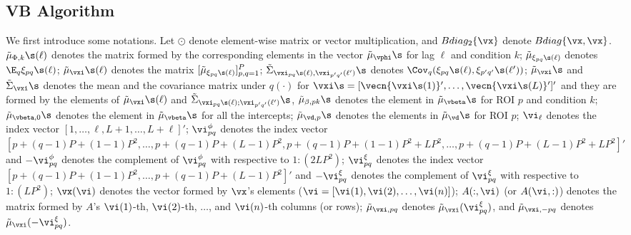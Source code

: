 {\color{blue}
\subsection*{VB Algorithm}
}
We first introduce some notations. Let $\odot$ denote element-wise matrix or vector multiplication, and $Bdiag_2\{\vx\}$ denote $Bdiag\{\vx, \vx\}$. 
$\tilde{\mu}_{\Phi,k}\s(\ell)$ denotes the matrix formed by the corresponding elements in the vector $\tilde{\mu}_{\vphi}\s$ for lag $\ell$ and condition $k$; 
$\tilde{\mu}_{\xi_{pq}\s(\ell)}$ denotes $\E_q\xi_{pq}\s(\ell)$; 
$\tilde{\mu}_{\vxi}\s(\ell)$ denotes the matrix $[\tilde{\mu}_{\xi_{pq}\s(\ell)}]_{p,q=1}^{P}$; 
$\tilde{\Sigma}_{\vxi_{pq}\s(\ell), \vxi_{p'q'}(\ell')}\s$ denotes $\Cov_q(\xi_{pq}\s(\ell), \xi_{p'q'}\s(\ell'))$; 
$\tilde{\mu}_{\vxi}\s$ and $\tilde{\Sigma}_{\vxi}\s$ denotes the mean and the covariance matrix under $q(\cdot)$ for $\vxi\s=[\vecn\{{\vxi}\s(1)\}', \dots, \vecn\{{\vxi}\s(L)\}']'$ and they are formed by the elements of $\tilde{\mu}_{\vxi}\s(\ell)$ and $\tilde{\Sigma}_{\vxi_{pq}\s(\ell); 
\vxi_{p'q'}(\ell')}\s$, $\tilde{\mu}_{\beta,pk}\s$ denotes the element in $\tilde{\mu}_{\vbeta}\s$ for ROI $p$ and condition $k$; 
$\tilde{\mu}_{\vbeta,0}\s$ denotes the element in $\tilde{\mu}_{\vbeta}\s$ for all the intercepts; 
$\tilde{\mu}_{\vd,p}\s$ denotes the elements in $\tilde{\mu}_{\vd}\s$ for ROI $p$; 
$\vi_{\ell}$ denotes the index vector $[1,\dots,\ell, L+1, \dots, L+\ell]'$; 
$\vi^{\phi}_{pq}$ denotes the index vector $[p+(q-1)P+(1-1)P^2, \dots, p+(q-1)P+(L-1)P^2, p+(q-1)P+(1-1)P^2+ LP^2, \dots, p+(q-1)P+(L-1)P^2 + LP^2]'$ and $-\vi^{\phi}_{pq}$ denotes the complement of $\vi^{\phi}_{pq}$ with respective to $1:(2LP^2)$; 
$\vi^{\xi}_{pq}$ denotes the index vector $[p+(q-1)P+(1-1)P^2, \dots, p+(q-1)P+(L-1)P^2]'$ and $-\vi^{\xi}_{pq}$ denotes the complement of $\vi^{\xi}_{pq}$ with respective to $1:(LP^2)$; 
$\vx(\vi)$ denotes the vector formed by $\vx$'s elements ($\vi=[\vi(1),\vi(2),\dots, \vi(n)]$); 
$A(:,\vi)$ (or $A(\vi,:)$) denotes the matrix formed by $A$'s $\vi(1)$-th, $\vi(2)$-th, $\dots$, and $\vi(n)$-th columns (or rows); 
$\tilde{\mu}_{\vxi,{pq}}$ denotes $\tilde{\mu}_{\vxi}(\vi^{\xi}_{pq})$, and $\tilde{\mu}_{\vxi,{-pq}}$ denotes $\tilde{\mu}_{\vxi}(-\vi^{\xi}_{pq})$. 


